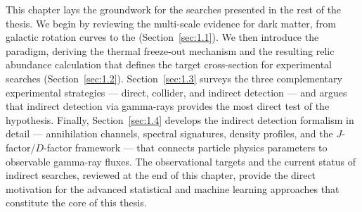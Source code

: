 This chapter lays the groundwork for the searches presented in the rest of the thesis.
We begin by reviewing the multi-scale evidence for dark matter, from galactic rotation curves to the \CMB (Section~\ref{sec:1.1}).
We then introduce the \WIMP paradigm, deriving the thermal freeze-out mechanism and the resulting relic abundance calculation that defines the target cross-section for experimental searches (Section~\ref{sec:1.2}).
Section~\ref{sec:1.3} surveys the three complementary experimental strategies --- direct, collider, and indirect detection --- and argues that indirect detection via gamma-rays provides the most direct test of the \WIMP hypothesis.
Finally, Section~\ref{sec:1.4} develops the indirect detection formalism in detail --- annihilation channels, spectral signatures, density profiles, and the $J$-factor/$D$-factor framework --- that connects particle physics parameters to observable gamma-ray fluxes.
The observational targets and the current status of indirect searches, reviewed at the end of this chapter, provide the direct motivation for the advanced statistical and machine learning approaches that constitute the core of this thesis.
